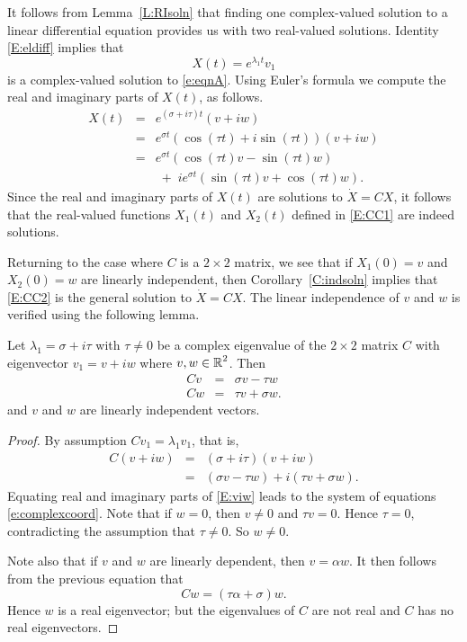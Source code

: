 \documentclass{ximera}
\begin{document}
It follows from Lemma~\ref{L:RIsoln} that finding one complex-valued solution
to a linear differential equation provides us with two real-valued solutions.
Identity \eqref{E:eldiff} implies that
\[
X(t) = e^{\lambda_1 t}v_1
\]
is a complex-valued solution to \eqref{e:eqnA}.  Using Euler's formula we
compute the real and imaginary parts of $X(t)$, as follows.
\begin{eqnarray*}
X(t) & = & e^{(\sigma+i\tau)t}(v+iw) \\
& = & e^{\sigma t} (\cos(\tau t)+i\sin(\tau t))(v+iw)\\
& = & e^{\sigma t}(\cos(\tau t)v-\sin(\tau t)w) \\ 
& & \; + \; ie^{\sigma t}(\sin(\tau t)v+\cos(\tau t)w).
\end{eqnarray*}
Since the real and imaginary parts of $X(t)$ are solutions to $\dot{X}=CX$, it
follows that the real-valued functions $X_1(t)$ and $X_2(t)$ defined in
\eqref{E:CC1} are indeed solutions.

Returning to the case where $C$ is a $2\times 2$ matrix, we see that if
$X_1(0)=v$ and $X_2(0)=w$ are linearly independent, then
Corollary~\ref{C:indsoln} implies that \eqref{E:CC2} is the general solution to
$\dot{X}=CX$.  The linear independence of $v$ and $w$ is verified using the
following lemma.

\begin{lemma}  \label{L:rievind}
Let $\lambda_1=\sigma+i\tau$ with $\tau\neq 0$ be a
complex eigenvalue of the
$2\times 2$ matrix $C$ with eigenvector
$v_1=v+iw$ where $v,w\in\mbox{$\Bbb{R}$}^2$.  Then
\begin{equation}  \label{e:complexcoord}
\begin{array}{rcl}
Cv & = & \sigma v - \tau w \\
Cw & = & \tau v + \sigma w.
\end{array}
\end{equation}
and $v$ and $w$ are linearly independent vectors.
\end{lemma}

\begin{proof}   By assumption $Cv_1=\lambda_1v_1$, that is,
\begin{equation}  \label{E:viw}
\begin{array}{rcl}
C (v+iw) & = & (\sigma+i\tau)(v+iw) \\
& = & (\sigma v - \tau w) + i(\tau v + \sigma w).
\end{array}
\end{equation}
Equating real and imaginary parts of \eqref{E:viw} leads to the system of
equations \eqref{e:complexcoord}.  Note that if $w=0$, then $v\neq 0$ and
$\tau v = 0$.  Hence $\tau=0$, contradicting the assumption that
$\tau\neq 0$.  So $w\neq 0$.

Note also that if $v$ and $w$ are linearly dependent, then $v=\alpha w$.
It then follows from the previous equation that
\[
Cw = (\tau\alpha+\sigma)w.
\]
Hence $w$ is a real eigenvector; but the eigenvalues of $C$ are not real and
$C$ has no real eigenvectors.   \end{proof}
\end{document}

